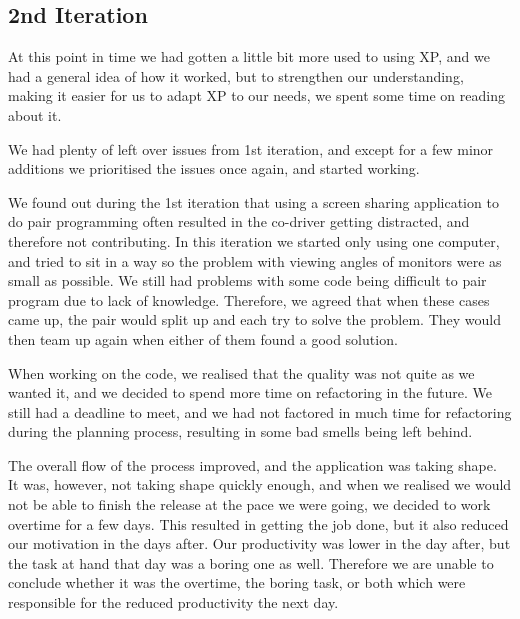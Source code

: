 \subsection{2nd Iteration}
At this point in time we had gotten a little bit more used to using XP, and we had a general idea of how it worked, but to strengthen our understanding, making it easier for us to adapt XP to our needs, we spent some time on reading about it.

We had plenty of left over issues from 1st iteration, and except for a few minor additions we prioritised the issues once again, and started working.

We found out during the 1st iteration that using a screen sharing application to do pair programming often resulted in the co-driver getting distracted, and therefore not contributing. In this iteration we started only using one computer, and tried to sit in a way so the problem with viewing angles of monitors were as small as possible. We still had problems with some code being difficult to pair program due to lack of knowledge. Therefore, we agreed that when these cases came up, the pair would split up and each try to solve the problem. They would then team up again when either of them found a good solution.

When working on the code, we realised that the quality was not quite as we wanted it, and we decided to spend more time on refactoring in the future. We still had a deadline to meet, and we had not factored in much time for refactoring during the planning process, resulting in some bad smells being left behind.


The overall flow of the process improved, and the application was taking shape. It was, however, not taking shape quickly enough, and when we realised we would not be able to finish the release at the pace we were going, we decided to work overtime for a few days. This resulted in getting the job done, but it also reduced our motivation in the days after. Our productivity was lower in the day after, but the task at hand that day was a boring one as well. Therefore we are unable to conclude whether it was the overtime, the boring task, or both which were responsible for the reduced productivity the next day.\\

